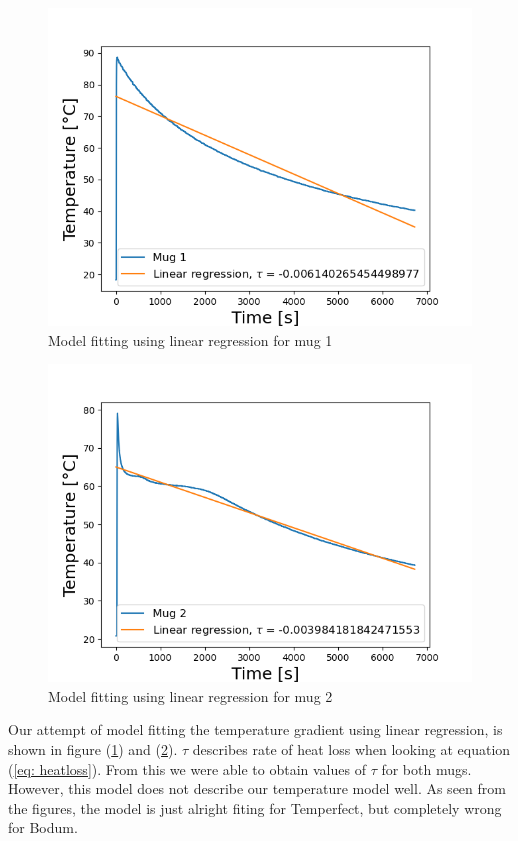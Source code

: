 \documentclass[reprint,english,notitlepage]{revtex4-2}
\begin{document}
\begin{figure}[h]
  \includegraphics[scale=0.5]{tau_t.png}
  \caption{Model fitting using linear regression for mug 1}\label{fig:tau_t}
\end{figure}


\begin{figure}[h]
  \includegraphics[scale=0.5]{tau_b.png}
  \caption{Model fitting using linear regression for mug 2}\label{fig: tau_b}
\end{figure}

Our attempt of model fitting the temperature gradient using linear regression, is shown in figure (\ref{fig:tau_t}) and (\ref{fig: tau_b}). $\tau$ describes rate of heat loss when looking at equation (\ref{eq: heatloss}). From this we were able to obtain values of $\tau$ for both mugs. However, this model does not describe our temperature model well. As seen from the figures, the model is just alright fiting for Temperfect, but completely wrong for Bodum.
\end{document}
